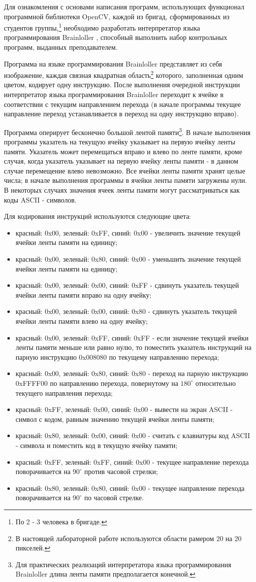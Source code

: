 
Для ознакомления с основами написания программ, использующих функционал программной библиотеки OpenCV, каждой из бригад, сформированных из студентов группы,\footnote{По 2 - 3 человека в бригаде.} необходимо разработать интерпретатор языка программирования Brainloller \cite{brainloller}, способный выполнить набор контрольных программ, выданных преподавателем.

Программа на языке программирования Brainloller представляет из себя изображение, каждая связная квадратная область\footnote{В настоящей лабораторной работе используются области рамером 20 на 20 пикселей.} которого, заполненная одним цветом, кодирует одну инструкцию. После выполнения очередной инструкции интерпретатор языка программирования Brainloller переходит к ячейке в соответствии с текущим направлением перехода (в начале программы текущее направление переход устанавливается в переход на одну инструкцию вправо).

Программа оперирует бесконечно большой лентой памяти\footnote{Для практических реализаций интерпретатора языка программирования Brainloller длина ленты памяти предполагается конечной.}. В начале выполнения программы указатель на текущую ячейку указывает на первую ячейку ленты памяти. Указатель может перемещаться вправо и влево по ленте памяти, кроме случая, когда указатель указывает на первую ячейку ленты памяти - в данном случае перемещение влево невозможно. Все ячейки ленты памяти хранят целые числа; в начале выполнения программы в ячейки ленты памяти загружены нули. В некоторых случаях значения ячеек ленты памяти могут рассматриваться как коды ASCII - символов.

Для кодирования инструкций используются следующие цвета:

\newcommand{\blcolor}[5]{\item красный: 0x#3, зеленый: 0x#2, синий: 0x#1 - #4#5}

\begin{itemize}

	\blcolor{00}{FF}{00}{увеличить значение текущей ячейки ленты памяти на единицу}{;}
	\blcolor{00}{80}{00}{уменьшить значение текущей ячейки ленты памяти на единицу}{;} 
	\blcolor{FF}{00}{00}{сдвинуть указатель текущей ячейки ленты памяти вправо на одну ячейку}{;} 
	\blcolor{80}{00}{00}{сдвинуть указатель текущей ячейки ленты памяти влево на одну ячейку}{;} 
	\blcolor{FF}{FF}{00}{если значение текущей ячейки ленты памяти меньше или равно нулю, то поместить указатель инструкций на парную инструкцию 0x008080 по текущему направлению перехода}{;} 
	\blcolor{80}{80}{00}{переход на парную инструкцию 0xFFFF00 по направлению перехода, повернутому на $180^\circ$ относительно текущего направления перехода}{;}
	\blcolor{00}{00}{FF}{вывести на экран ASCII - символ с кодом, равным значению текущей ячейки ленты памяти}{;} 
	\blcolor{00}{00}{80}{считать с клавиатуры код ASCII - символа и поместить код в текущую ячейку памяти}{;} 
	\blcolor{00}{FF}{FF}{текущее направление перехода поворачивается на $90^\circ$ против часовой стрелки}{;}
	\blcolor{00}{80}{80}{текущее направление перехода поворачивается на $90^\circ$ по часовой стрелке}{.}

\end{itemize}

